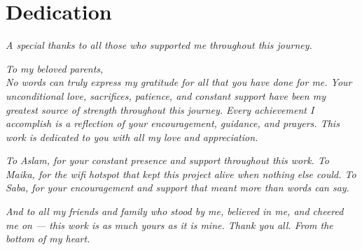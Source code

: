 \section*{Dedication}

\vspace*{\fill}

\begin{center}
\textit{A special thanks to all those who supported me throughout this journey.}

\vspace{1cm}

\textit{To my beloved parents,\\
No words can truly express my gratitude for all that you have done for me.
Your unconditional love, sacrifices, patience, and constant support
have been my greatest source of strength throughout this journey.
Every achievement I accomplish is a reflection of your encouragement, guidance, and prayers.
This work is dedicated to you with all my love and appreciation.}

\vspace{1.2cm}

\textit{To Aslam, for your constant presence and support throughout this work.
To Maika, for the wifi hotspot that kept this project alive when nothing else could.
To Saba, for your encouragement and support that meant more than words can say.}

\vspace{1.2cm}

\textit{And to all my friends and family who stood by me, believed in me,
and cheered me on --- this work is as much yours as it is mine.
Thank you all. From the bottom of my heart.}

\end{center}

\vspace*{\fill}

\newpage
